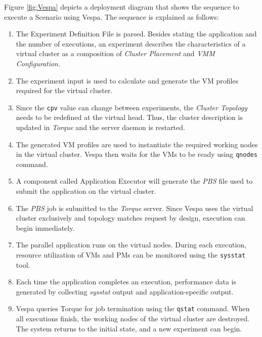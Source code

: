 \documentclass[11pt]{article}
\begin{document}
\begin{itemize}
Figure \ref{fig:Vespa} depicts a deployment diagram that shows the sequence to execute a Scenario using Vespa. The sequence is explained as follows:
\begin{enumerate}
  \item The Experiment Definition File is parsed. Besides stating the application and the number of executions, an experiment describes the characteristics of a virtual cluster as a composition of \emph{Cluster Placement} and \emph{VMM Configuration}. %
  \vskip5pt
  \item The experiment input is used to calculate and generate the VM profiles required for the virtual cluster.
  \vskip5pt
  \item Since the \texttt{cpv} value can change between experiments, the \emph{Cluster Topology} needs to be redefined at the virtual head. Thus, the cluster description is updated in \emph{Torque} and the server daemon is restarted.
  \vskip5pt
  \item The generated VM profiles are used to instantiate the required working nodes in the virtual cluster. Vespa then waits for the VMs to be ready using \texttt{qnodes} command.
  \vskip5pt
  \item A component called Application Executor will generate the \emph{PBS} file used to submit the application on the virtual cluster.
  \vskip5pt
  \item The \emph{PBS} job is submitted to the \emph{Torque} server. Since Vespa uses the virtual cluster exclusively and topology matches request by design, execution can begin immediately.
  \vskip5pt
  \item The parallel application runs on the virtual nodes. During each execution, resource utilization of VMs and PMs can be monitored using the \texttt{sysstat} tool.
  \vskip5pt
  \item Each time the application completes an execution, performance data is generated by collecting \emph{sysstat} output and application-specific output.
  \vskip5pt
  \item Vespa queries Torque for job termination using the \texttt{qstat} command. When all executions finish, the working nodes of the virtual cluster are destroyed. The system returns to the initial state, and a new experiment can begin.
\end{enumerate}
  


\end{itemize}
\end{document}
